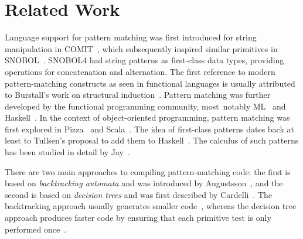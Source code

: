 \section{Related Work} %
\label{sec:rw}

Language support for pattern matching was first introduced for string manipulation 
in COMIT~\cite{COMIT58}, which subsequently inspired similar primitives in 
SNOBOL~\cite{SNOBOL64}. SNOBOL4 had string patterns as first-class data types,
providing operations for concatenation and alternation.
The first reference to modern pattern-matching constructs as seen in functional 
languages is usually attributed to Burstall's work on structural 
induction~\cite{Burstall69provingproperties}. Pattern matching was further 
developed by the functional programming community, most~notably 
ML~\cite{ML78} and Haskell~\cite{haskell90}. In the context of object-oriented programming, 
pattern matching was first explored in Pizza~\cite{Odersky97pizzainto} and 
Scala~\cite{Scala2nd,EmirThesis}. The idea of first-class patterns dates back 
at least to Tullsen's proposal to add them to Haskell~\cite{Tullsen00}. The calculus of 
such patterns has been studied in detail by Jay~\cite{Jay09,PatCalc09}.

There are two main approaches to compiling pattern-matching code: the first is 
based on \emph{backtracking automata} and was introduced by Augustsson~\cite{Augustsson85}, and
the second is based on \emph{decision trees} and was first described by 
Cardelli~\cite{Cardelli84}. %
The backtracking approach usually generates smaller code~\cite{OPM01}, whereas the decision tree 
approach produces faster code by ensuring that each primitive test is only 
performed once~\cite{Maranget08}. %

